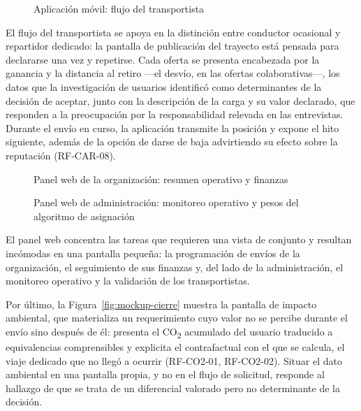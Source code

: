 {\begin{figure}[H]
    \centering\color{nuevo}
    \hfill
    \hfill
    \caption{Aplicación móvil: flujo del transportista}
    \label{fig:mockup-transportista}
\end{figure}

El flujo del transportista se apoya en la distinción entre conductor ocasional y repartidor dedicado: la pantalla de publicación del trayecto está pensada para declararse una vez y repetirse. Cada oferta se presenta encabezada por la ganancia y la distancia al retiro ---el desvío, en las ofertas colaborativas---, los datos que la investigación de usuarios identificó como determinantes de la decisión de aceptar, junto con la descripción de la carga y su valor declarado, que responden a la preocupación por la responsabilidad relevada en las entrevistas. Durante el envío en curso, la aplicación transmite la posición y expone el hito siguiente, además de la opción de darse de baja advirtiendo su efecto sobre la reputación (RF-CAR-08).

\begin{figure}[H]
    \centering\color{nuevo}
    \caption{Panel web de la organización: resumen operativo y finanzas}
    \label{fig:mockup-panel}
\end{figure}

\begin{figure}[H]
    \centering\color{nuevo}
    \caption{Panel web de administración: monitoreo operativo y pesos del algoritmo de asignación}
    \label{fig:mockup-admin}
\end{figure}

El panel web concentra las tareas que requieren una vista de conjunto y resultan incómodas en una pantalla pequeña: la programación de envíos de la organización, el seguimiento de sus finanzas y, del lado de la administración, el monitoreo operativo y la validación de los transportistas.

Por último, la Figura~\ref{fig:mockup-cierre} muestra la pantalla de impacto ambiental, que materializa un requerimiento cuyo valor no se percibe durante el envío sino después de él: presenta el CO\textsubscript{2} acumulado del usuario traducido a equivalencias comprensibles y explicita el contrafactual con el que se calcula, el viaje dedicado que no llegó a ocurrir (RF-CO2-01, RF-CO2-02). Situar el dato ambiental en una pantalla propia, y no en el flujo de solicitud, responde al hallazgo de que se trata de un diferencial valorado pero no determinante de la decisión.

}
